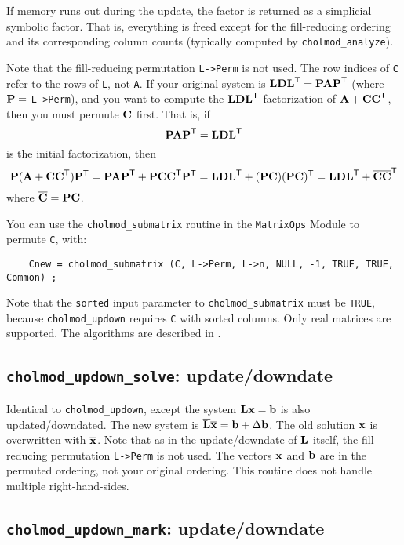 \documentclass[11pt]{article}
\newcommand{\m}[1]{{\bf{#1}}}       %
\newcommand{\tr}{^{\sf T}}          %
\newcommand{\new}[1]{\overline{#1}}
\begin{document}
If memory runs out during the update, the factor is returned as a simplicial
symbolic factor.  That is, everything is freed except for the fill-reducing
ordering and its corresponding column counts (typically computed by
{\tt cholmod\_analyze}).

Note that the fill-reducing permutation {\tt L->Perm} is not used.  The row
indices of {\tt C} refer to the rows of {\tt L}, not {\tt A}.  If your original system is
$\m{LDL}\tr = \m{PAP}\tr$ (where $\m{P} =$ {\tt L->Perm}), and you want to compute the $\m{LDL}\tr$
factorization of $\m{A}+\m{CC}\tr$, then you must permute $\m{C}$ first.  That is,
if
\[
    \m{PAP}\tr = \m{LDL}\tr
\]
is the initial factorization, then
\[
\m{P}(\m{A}+\m{CC}\tr)\m{P}\tr
    = \m{PAP}\tr+\m{PCC}\tr\m{P}\tr
    = \m{LDL}\tr + (\m{PC})(\m{PC})\tr
    = \m{LDL}\tr + \new{\m{C}}\new{\m{C}}\tr
\]
where $\new{\m{C}} = \m{PC}$.

You can use the {\tt cholmod\_submatrix} routine in the {\tt MatrixOps} Module
to permute {\tt C}, with:
\begin{verbatim}
    Cnew = cholmod_submatrix (C, L->Perm, L->n, NULL, -1, TRUE, TRUE, Common) ;
\end{verbatim}

Note that the {\tt sorted} input parameter to {\tt cholmod\_submatrix} must be {\tt TRUE},
because {\tt cholmod\_updown} requires {\tt C} with sorted columns.
Only real matrices are supported.
The algorithms are described in \cite{DavisHager99,DavisHager01}.

\subsection{{\tt cholmod\_updown\_solve}: update/downdate}


Identical to {\tt cholmod\_updown}, except
the system $\m{Lx}=\m{b}$ is also updated/downdated.
The new system is $\new{\m{L}}\new{\m{x}}=\m{b} + \Delta \m{b}$.  The old solution $\m{x}$ is overwritten
with $\new{\m{x}}$.  Note that as in the update/downdate of $\m{L}$ itself, the fill-
reducing permutation {\tt L->Perm} is not used.  The vectors $\m{x}$ and $\m{b}$ are in the permuted
ordering, not your original ordering.  This routine does not handle multiple right-hand-sides.

\newpage
\subsection{{\tt cholmod\_updown\_mark}: update/downdate}
\end{document}
